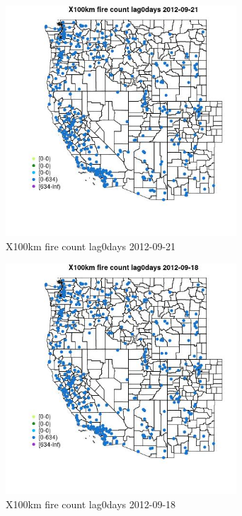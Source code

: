 \begin{figure} 
\centering  
\includegraphics[width=0.77\textwidth]{Code_Outputs/Report_ML_input_PM25_Step4_part_e_de_duplicated_aves_compiled_2019-05-14wNAs_MapObsX100km_fire_count_lag0days2012-09-21.jpg} 
\caption{\label{fig:Report_ML_input_PM25_Step4_part_e_de_duplicated_aves_compiled_2019-05-14wNAsMapObsX100km_fire_count_lag0days2012-09-21}X100km fire count lag0days 2012-09-21} 
\end{figure} 
 

\begin{figure} 
\centering  
\includegraphics[width=0.77\textwidth]{Code_Outputs/Report_ML_input_PM25_Step4_part_e_de_duplicated_aves_compiled_2019-05-14wNAs_MapObsX100km_fire_count_lag0days2012-09-18.jpg} 
\caption{\label{fig:Report_ML_input_PM25_Step4_part_e_de_duplicated_aves_compiled_2019-05-14wNAsMapObsX100km_fire_count_lag0days2012-09-18}X100km fire count lag0days 2012-09-18} 
\end{figure} 
 

